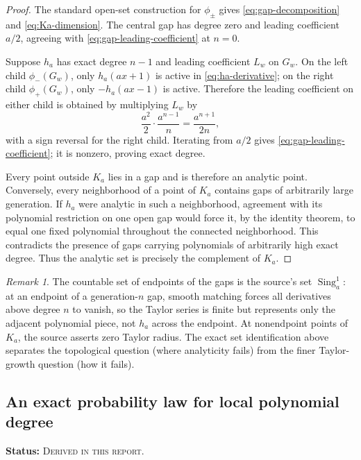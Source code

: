 \documentclass[11pt]{article}
\theoremstyle{definition}
\theoremstyle{remark}
\newtheorem{remark}[theorem]{Remark}
\newcommand{\Sing}{\operatorname{Sing}}
\newcommand{\DerivedStatus}{\textcolor{DerivedPurple}{\textsc{Derived in this report}}}
\newcommand{\status}[1]{\par\smallskip\noindent\textbf{Status:} #1.\par\smallskip}
\begin{document}
\begin{proof}
The standard open-set construction for \(\phi_\pm\) gives \eqref{eq:gap-decomposition} and \eqref{eq:Ka-dimension}.  The central gap has degree zero and leading coefficient \(a/2\), agreeing with \eqref{eq:gap-leading-coefficient} at \(n=0\).

Suppose \(h_a\) has exact degree \(n-1\) and leading coefficient \(L_w\) on \(G_w\).  On the left child \(\phi_-(G_w)\), only \(h_a(ax+1)\) is active in \eqref{eq:ha-derivative}; on the right child \(\phi_+(G_w)\), only \(-h_a(ax-1)\) is active.  Therefore the leading coefficient on either child is obtained by multiplying \(L_w\) by
\begin{equation}
  \frac{a^2}{2}\cdot\frac{a^{n-1}}{n}
  =\frac{a^{n+1}}{2n},
  \label{eq:leading-recursion}
\end{equation}
with a sign reversal for the right child.  Iterating from \(a/2\) gives \eqref{eq:gap-leading-coefficient}; it is nonzero, proving exact degree.

Every point outside \(K_a\) lies in a gap and is therefore an analytic point.  Conversely, every neighborhood of a point of \(K_a\) contains gaps of arbitrarily large generation.  If \(h_a\) were analytic in such a neighborhood, agreement with its polynomial restriction on one open gap would force it, by the identity theorem, to equal one fixed polynomial throughout the connected neighborhood.  This contradicts the presence of gaps carrying polynomials of arbitrarily high exact degree.  Thus the analytic set is precisely the complement of \(K_a\).
\end{proof}

\begin{remark}
The countable set of endpoints of the gaps is the source's set \(\Sing_a^1\): at an endpoint of a generation-\(n\) gap, smooth matching forces all derivatives above degree \(n\) to vanish, so the Taylor series is finite but represents only the adjacent polynomial piece, not \(h_a\) across the endpoint.  At nonendpoint points of \(K_a\), the source asserts zero Taylor radius.  The exact set identification above separates the topological question (where analyticity fails) from the finer Taylor-growth question (how it fails).
\end{remark}

\subsection{An exact probability law for local polynomial degree}
\status{\DerivedStatus}
\end{document}
